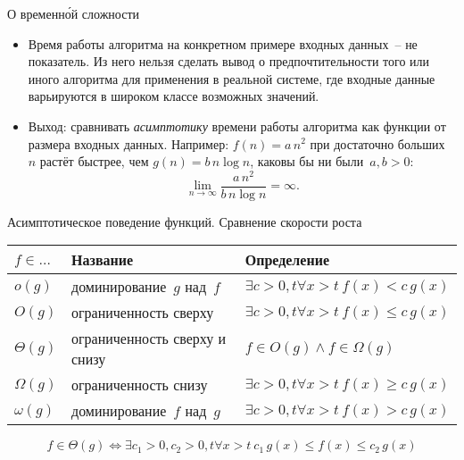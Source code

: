 \documentclass[landscape]{slides}
\begin{document}
\begin{slide}
  О временн\'{о}й сложности
  \begin{itemize}
    \item Время работы алгоритма на конкретном примере входных данных~-- не показатель. Из него нельзя сделать
      вывод о предпочтительности того или иного алгоритма для применения в реальной системе, где входные данные
      варьируются в широком классе возможных значений.
    \item Выход: сравнивать \emph{асимптотику} времени работы алгоритма как функции от размера входных данных.
      Например: $f(n)=a\,n^2$ при достаточно больших~$n$ растёт быстрее, чем $g(n)=b\,n\log n$, каковы бы ни были~$a,b>0$:
      \[
        \lim_{n \to \infty} \frac{a\,n^2}{b\,n\log n} = \infty .
      \]
  \end{itemize}
\end{slide}

\begin{slide}
  Асимптотическое поведение функций. Сравнение скорости роста
  \begin{center}
    \renewcommand{\arraystretch}{2}
    \begin{tabularx}{\textwidth}{|l|l|X|}
      \hline
      $f\in\ldots$&
      Название&
      Определение
      \\
      \hline
      \hline
      $o(g)$&
      доминирование~$g$ над~$f$&
      $\exists c>0, t \forall x>t\ f(x) < c\,g(x)$
      \\
      \hline
      $O(g)$&
      ограниченность сверху&
      $\exists c>0, t \forall x>t\ f(x) \leqslant c\,g(x)$
      \\
      \hline
      $\Theta(g)$&
      ограниченность сверху и снизу&
      $f\in O(g) \land f\in \Omega(g)$
      \\
      \hline
      $\Omega(g)$&
      ограниченность снизу&
      $\exists c>0, t \forall x>t\ f(x) \geqslant c\,g(x)$
      \\
      \hline
      $\omega(g)$&
      доминирование~$f$ над~$g$&
      $\exists c>0, t \forall x>t\ f(x) > c\,g(x)$
      \\
      \hline
    \end{tabularx}
  \end{center}
  \[
    f\in\Theta(g) \Leftrightarrow \exists c_1>0,c_2>0, t\forall x>t\ c_1\, g(x) \leqslant f(x) \leqslant c_2\,g(x)
  \]
\end{slide}
\end{document}

